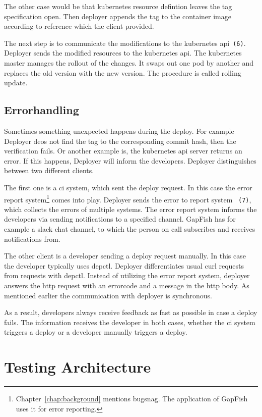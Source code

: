 The other case would be that kubernetes resource defintion leaves the tag specification
open. Then deployer appends the tag to the container image according to reference which the client provided.

The next step is to communicate the modifications to the kubernetes
api~\texttt{(6)}. Deployer sends the modified resources to the kubernetes api. The
kubernetes master manages the rollout of the changes. It swaps out one pod by another and
replaces the old version with the new version. The procedure is called rolling update.

\subsection{Errorhandling}

Sometimes something unexpected happens during the deploy. For example Deployer deos not
find the tag to the corresponding commit hash, then the verification fails. Or another
example is, the kubernetes api server returns an error. If this happens, Deployer will
inform the developers. Deployer distinguishes between two different clients.

The first one is a \gls{ci} system, which sent the deploy request. In this case the error
report system\footnote{Chapter~\ref{chap:background} mentions bugsnag. The application of
  GapFish uses it for error reporting.} comes into play. Deployer sends the error to
report system ~\texttt{(7)}, which collects the errors of multiple systems. The error
report system informs the developers via sending notifications to a specified
channel. GapFish has for example a slack chat channel, to which the person on call
subscribes and receives notifications from.

The other client is a developer sending a deploy request manually. In this case the
developer typically uses depctl. Deployer differentiates usual curl requests from requests
with depctl. Instead of utilizing the error report system, deployer answers the http
request with an errorcode and a message in the http body. As mentioned earlier the
communication with deployer is synchronous.

As a result, developers always receive feedback as fast as possible in case a deploy
fails. The information receives the developer in both cases, whether the \gls{ci} system
triggers a deploy or a developer manually triggers a deploy.

\section{Testing Architecture}
\label{test_architecture}

